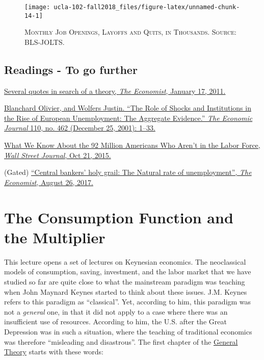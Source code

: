\documentclass[]{book}
\theoremstyle{definition}
\theoremstyle{definition}
\theoremstyle{definition}
\theoremstyle{remark}
\begin{document}
\begin{figure}

{\centering \texttt{[image: ucla-102-fall2018\_files/figure-latex/unnamed-chunk-14-1]} 

}

\caption{\textsc{Monthly Job Openings, Layoffs and
Quits, in Thousands. Source: BLS-JOLTS}.}\label{fig:unnamed-chunk-14}
\end{figure}

\section*{Readings - To go further}\label{readings---to-go-further-3}

\href{https://www.economist.com/free-exchange/2011/01/17/several-quotes-in-search-of-a-theory}{Several
quotes in search of a theory, \emph{The Economist}, January 17, 2011.}

\href{https://doi.org/10.1111/1468-0297.00518}{Blanchard Olivier, and
Wolfers Justin. ``The Role of Shocks and Institutions in the Rise of
European Unemployment: The Aggregate Evidence.'' \emph{The Economic
Journal} 110, no. 462 (December 25, 2001): 1--33.}

\href{https://blogs.wsj.com/economics/2015/10/21/what-we-know-about-the-92-million-americans-who-arent-in-the-labor-force/}{What
We Know About the 92 Million Americans Who Aren't in the Labor Force,
\emph{Wall Street Journal}, Oct 21, 2015.}

(Gated)
\href{https://www.economist.com/economics-brief/2017/08/26/the-natural-rate-of-unemployment}{``Central
bankers' holy grail: The Natural rate of unemployment'', \emph{The
Economist}, August 26, 2017.}

\hypertarget{cons-function}{\chapter{The Consumption Function and the
Multiplier}\label{cons-function}}

This lecture opens a set of lectures on Keynesian economics. The
neoclassical models of consumption, saving, investment, and the labor
market that we have studied so far are quite close to what the
mainstream paradigm was teaching when John Maynard Keynes started to
think about these issues. J.M. Keynes refers to this paradigm as
``classical''. Yet, according to him, this paradigm was not a
\emph{general} one, in that it did not apply to a case where there was
an insufficient use of resources. According to him, the U.S. after the
Great Depression was in such a situation, where the teaching of
traditional economics was therefore ``misleading and disastrous''. The
first chapter of the
\href{http://cas2.umkc.edu/economics/people/facultypages/kregel/courses/econ645/winter2011/generaltheory.pdf}{General
Theory} starts with these words:
\end{document}
